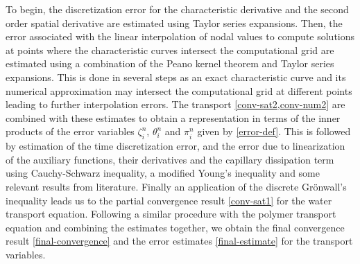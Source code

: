 \documentclass[11pt]{article}
\begin{document}
To begin, the discretization error for the characteristic derivative and the second order spatial derivative are estimated using Taylor series expansions. Then, the error associated with the linear interpolation of nodal values to compute solutions at points where the characteristic curves intersect the computational grid are estimated using a combination of the Peano kernel theorem and Taylor series expansions. This is done in several steps as an exact characteristic curve and its numerical approximation may intersect the computational grid at different points leading to further interpolation errors. The transport \cref{conv-sat2,conv-num2} are combined with these estimates to obtain a representation in terms of the inner products of the error variables $\zeta_i^n$, $\theta_i^n$ and $\pi_i^n$ given by \cref{error-def}. This is followed by estimation of the time discretization error, and the error due to linearization of the auxiliary functions, their derivatives and the capillary dissipation term using Cauchy-Schwarz inequality, a modified Young's inequality and some relevant results from literature. Finally an application of the discrete Gr\"{o}nwall's inequality leads us to the partial convergence result \eqref{conv-sat1} for the water transport equation. Following a similar procedure with the polymer transport equation and combining the estimates together, we obtain the final convergence result \eqref{final-convergence} and the error estimates \eqref{final-estimate} for the transport variables. 
\end{document}
